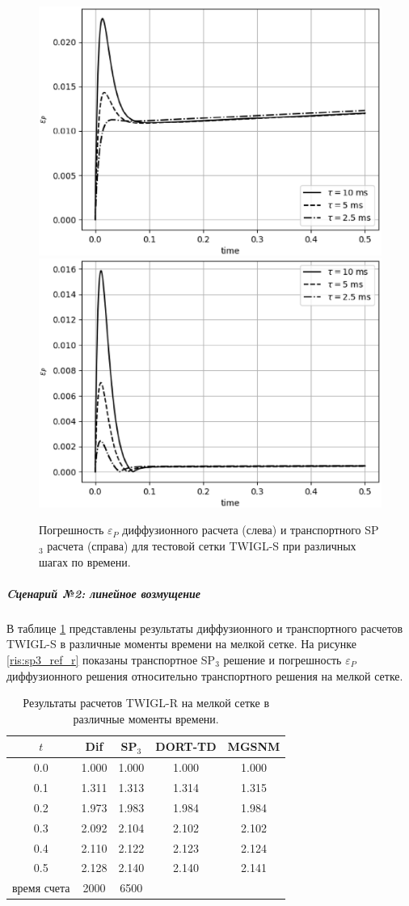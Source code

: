 \documentclass{crm-article}
\begin{document}
\begin{figure}[ht]
\begin{center}
	\includegraphics[width=0.4\linewidth]{dif_tau_s.eps}\hspace{20pt}
	\includegraphics[width=0.4\linewidth]{sp3_tau_s.eps}\\
	\caption{\label{image:canonsummary} Погрешность $\varepsilon_P$ диффузионного расчета (слева) и транспортного SP$_3$ расчета (справа) для тестовой сетки TWIGL-S при различных шагах по времени.}
	\label{ris:tau_s}
\end{center}
\end{figure}

\subparagraph{Cценарий №2: линейное возмущение}
В таблице \ref{table:twigl-r} представлены результаты диффузионного и транспортного расчетов TWIGL-S в различные моменты времени на мелкой сетке.
На рисунке \ref{ris:sp3_ref_r} показаны транспортное SP$_3$ решение и погрешность $\varepsilon_P$ диффузионного решения относительно транспортного решения на мелкой сетке. 

\begin{table}[ht]
\caption{Результаты расчетов TWIGL-R на мелкой сетке в различные моменты времени.}
\label{table:twigl-r}
\begin{center}
\begin{tabular}{c c c c c}
\hline
$t$ & Dif & SP$_3$ & DORT-TD & MGSNM \\
\hline
0.0 & 1.000 & 1.000 & 1.000 & 1.000\\
0.1 & 1.311 & 1.313 & 1.314 & 1.315\\
0.2 & 1.973 & 1.983 & 1.984 & 1.984\\
0.3 & 2.092 & 2.104 & 2.102 & 2.102\\
0.4 & 2.110 & 2.122 & 2.123 & 2.124\\
0.5 & 2.128 & 2.140 & 2.140 & 2.141\\
\hline
время счета & 2000 & 6500 \\
\end{tabular}
\end{center}
\end{table}
\end{document}
